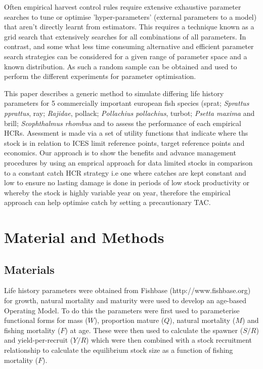 \documentclass[preprint,12pt]{elsarticle}
\begin{document}
Often empirical harvest control rules require extensive exhaustive parameter searches to tune or optimise 'hyper-parameters' (external parameters to a model) that aren’t directly learnt from estimators.  This requires a technique known as a grid search that extensively searches for all combinations of all parameters. In contrast, and some what less time consuming alternative and efficient parameter search strategies can be considered for a given range of parameter space and a known distribution.  As such a random sample can be obtained and used to perform the different experiments for parameter optimisation. 

This paper describes a generic method to simulate differing life history parameters for 5 commercially important european fish species  (sprat; \emph{Sprattus pprattus}, ray; \emph{Rajidae}, pollack; \emph{Pollachius pollachius}, turbot; \emph{Psetta maxima} and brill; \emph{Scophthalmus rhombus} and to assess the performance of each empirical HCRs.  Asessment is made via a set of utility functions that indicate where ths stock is in relation to ICES limit reference points, target reference points and economics. Our approach is to show the benefits and advance management procedures by using an emprical approach for data limited stocks in comparison to a constant catch HCR strategy i.e one where catches are kept constant and low to ensure no lasting damage is done in periods of low stock productivity or whereby the stock is highly variable year on year, therefore the empirical approach can help optimise catch by setting a precautionary TAC. 


\section{Material and Methods}
\subsection{Materials}


Life history parameters were obtained from Fishbase (http://www.fishbase.org) for growth, natural mortality and maturity were used to develop an age-based Operating Model. To do this the parameters were first used to parameterise functional forms for mass ($W$), proportion mature ($Q$), natural mortality ($M$) and fishing mortality ($F$) at age. These were then used to calculate the  spawner ($S/R$) and yield-per-recruit ($Y/R$) which were then combined with a stock recruitment relationship \cite{sissenwine1987alternative} to calculate the equilibrium stock size as a function of fishing mortality ($F$). 
\end{document}
